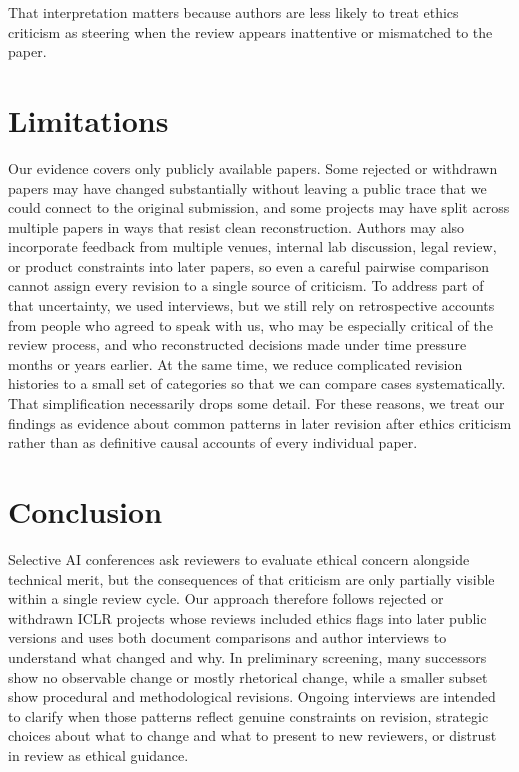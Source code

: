 \documentclass[sigconf,nonacm]{acmart} %
\begin{document}
That interpretation matters because authors are less likely to treat ethics criticism as steering when the review appears inattentive or mismatched to the paper.

\section{Limitations}

Our evidence covers only publicly available papers. Some rejected or withdrawn papers may have changed substantially without leaving a public trace that we could connect to the original submission, and some projects may have split across multiple papers in ways that resist clean reconstruction. Authors may also incorporate feedback from multiple venues, internal lab discussion, legal review, or product constraints into later papers, so even a careful pairwise comparison cannot assign every revision to a single source of criticism. To address part of that uncertainty, we used interviews, but we still rely on retrospective accounts from people who agreed to speak with us, who may be especially critical of the review process, and who reconstructed decisions made under time pressure months or years earlier. At the same time, we reduce complicated revision histories to a small set of categories so that we can compare cases systematically. That simplification necessarily drops some detail. For these reasons, we treat our findings as evidence about common patterns in later revision after ethics criticism rather than as definitive causal accounts of every individual paper.

\section{Conclusion}

Selective AI conferences ask reviewers to evaluate ethical concern alongside technical merit, but the consequences of that criticism are only partially visible within a single review cycle. Our approach therefore follows rejected or withdrawn ICLR projects whose reviews included ethics flags into later public versions and uses both document comparisons and author interviews to understand what changed and why. In preliminary screening, many successors show no observable change or mostly rhetorical change, while a smaller subset show procedural and methodological revisions. Ongoing interviews are intended to clarify when those patterns reflect genuine constraints on revision, strategic choices about what to change and what to present to new reviewers, or distrust in review as ethical guidance.
\end{document}
